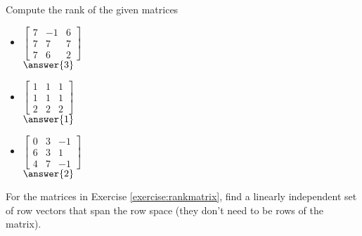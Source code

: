 \documentclass{ximera}
\begin{document}
\begin{exercise} \label{exercise:rankmatrixans}%
    Compute the rank of the given matrices
    \begin{itemize}
        \item
        $\begin{bmatrix}
            7 & -1 & 6 \\
            7 & 7 & 7 \\
            7 & 6 & 2
        \end{bmatrix}$\\ $\answer{3}$
        \item
        $\begin{bmatrix}
            1 & 1 & 1 \\
            1 & 1 & 1 \\
            2 & 2 & 2
        \end{bmatrix}$\\ $\answer{1}$
        \item
        $\begin{bmatrix}
            0 & 3 & -1 \\
            6 & 3 & 1 \\
            4 & 7 & -1
        \end{bmatrix}$\\ $\answer{2}$
    \end{itemize}
\end{exercise}


\begin{exercise}
    For the matrices in Exercise \ref{exercise:rankmatrix}, find a linearly independent set of row vectors that span the row space (they don't need to be rows of the matrix).
\end{exercise}
\end{document}

